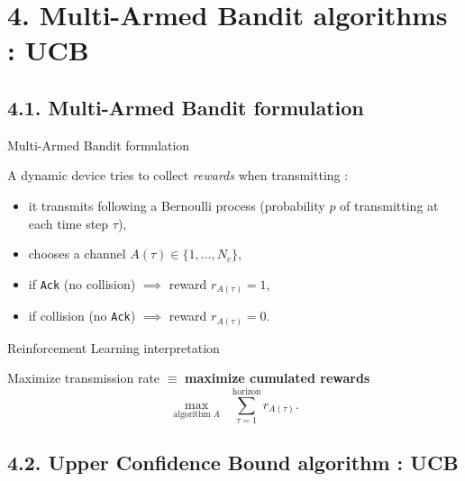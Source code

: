 \documentclass[12pt,english,ignorenonframetext,aspectratio=169,]{beamer}
\providecommand{\tightlist}{%
  \setlength{\itemsep}{0pt}\setlength{\parskip}{0pt}}
\begin{document}
\section{\hfill{}4. Multi-Armed Bandit algorithms : UCB\hfill{}}

\subsection{\hfill{}4.1. Multi-Armed Bandit formulation\hfill{}}

\begin{frame}[fragile]{Multi-Armed Bandit formulation}

A dynamic device tries to collect \emph{rewards} when transmitting :

\begin{itemize}
\tightlist
\item
  it transmits following a Bernoulli process \newline
   (probability \(p\) of transmitting at each time step \(\tau\)),
\item
  chooses a channel \(A(\tau) \in \{1,\dots,N_c\}\),
\item
  if \texttt{Ack} (no collision) \hspace*{10pt} \(\implies\) reward
  \(r_{A(\tau)} = 1\),
\item
  if collision (no \texttt{Ack}) \hspace*{10pt} \(\implies\) reward
  \(r_{A(\tau)} = 0\).
\end{itemize}

\pause

\begin{block}{Reinforcement Learning interpretation}

Maximize transmission rate \(\equiv\) \textbf{maximize cumulated
rewards}
\[\max_{\text{algorithm}\;A} \;\; \sum_{\tau=1}^{\text{horizon}} r_{A(\tau)}.\]

\end{block}

\end{frame}

\subsection{\hfill{}4.2. Upper Confidence Bound algorithm : UCB\hfill{}}
\end{document}
